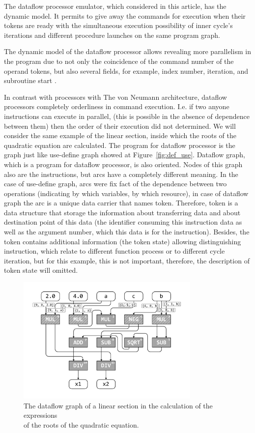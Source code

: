 \documentclass[
11pt,%
tightenlines,%
twoside,%
onecolumn,%
nofloats,%
nobibnotes,%
nofootinbib,%
superscriptaddress,%
noshowpacs,%
centertags]%
{revtex4}
\begin{document}
The dataflow processor emulator, which considered in this article, has the dynamic model. It permits to give away the commands for execution when their tokens are ready with the simultaneous execution possibility of inner cycle’s iterations and different procedure launches on the same program graph.

The dynamic model of the dataflow processor allows revealing more parallelism in the program due to not only the coincidence of the command number of the operand tokens, but also several fields, for example, index number, iteration, and subroutine start \cite{Wiley}.

In contrast with processors with The von Neumann architecture, dataflow processors completely orderliness in command execution. I.e. if two anyone instructions can execute in parallel, (this is possible in the absence of dependence between them) then the order of their execution did not determined. We will consider the same example of the linear section, inside which the roots of the quadratic equation are calculated. The program for dataflow processor is the graph just like use-define graph showed at Figure~\ref{fig:def_use}.
Dataflow graph, which is a program for dataflow processor, is also oriented. Nodes of this graph also are the instructions, but arcs have a completely different meaning. In the case of use-define graph, arcs were fix fact of the dependence between two operations (indicating by which variables, by which resource), in case of dataflow graph the arc is a unique data carrier that names token. Therefore, token is a data structure that storage the information about transferring data and about destination point of this data (the identifier consuming this instruction data as well as the argument number, which this data is for the instruction). Besides, the token contains additional information (the token state) allowing distinguishing instruction, which relate to different function process or to different cycle iteration, but for this example, this is not important, therefore, the description of token state will omitted.

\begin{figure}[h]
\setcaptionmargin{5mm}
\onelinecaptionsfalse %
\includegraphics[width=0.80\textwidth]{pics/dataflow.pdf}
\caption{The dataflow graph of a linear section in the calculation of the expressions \\ of the roots of the quadratic equation.}\label{fig:dataflow}
\end{figure}
\end{document}
